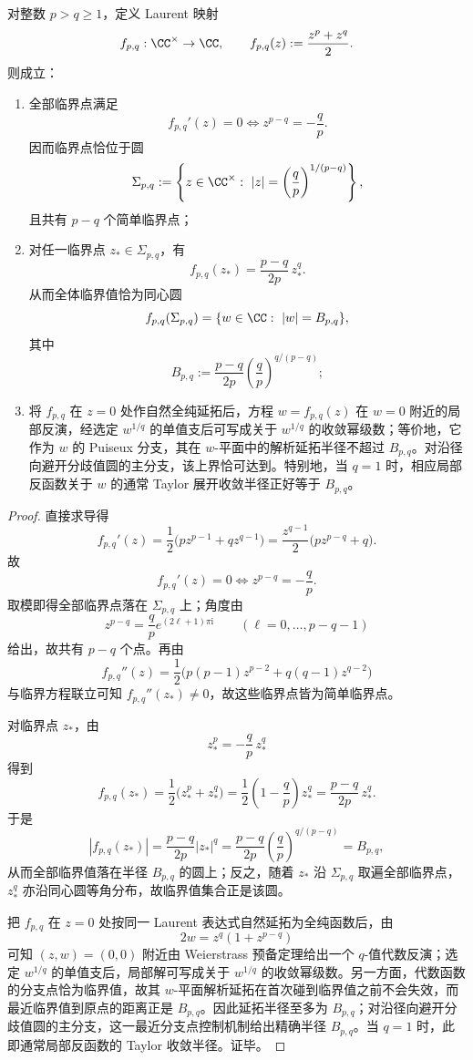 \begin{theorem}\label{thm:cdim-laurent-double-frequency-critical-value-circle}
对整数 \(p>q\ge 1\)，定义 Laurent 映射
\[
f_{p,q}:\CC^\times\to\CC,
\qquad
f_{p,q}(z):=\frac{z^p+z^q}{2}.
\]
则成立：
\begin{enumerate}
  \item 全部临界点满足
  \[
  f_{p,q}'(z)=0
  \iff
  z^{p-q}=-\frac{q}{p}.
  \]
  因而临界点恰位于圆
  \[
  \Sigma_{p,q}:=
  \left\{
  z\in\CC^\times:\ |z|=\left(\frac{q}{p}\right)^{1/(p-q)}
  \right\},
  \]
  且共有 \(p-q\) 个简单临界点；
  \item 对任一临界点 \(z_\ast\in\Sigma_{p,q}\)，有
  \[
  f_{p,q}(z_\ast)=\frac{p-q}{2p}\,z_\ast^q.
  \]
  从而全体临界值恰为同心圆
  \[
  f_{p,q}(\Sigma_{p,q})
  =
  \{w\in\CC:\ |w|=B_{p,q}\},
  \]
  其中
  \[
  B_{p,q}:=\frac{p-q}{2p}\left(\frac{q}{p}\right)^{q/(p-q)};
  \]
  \item 将 \(f_{p,q}\) 在 \(z=0\) 处作自然全纯延拓后，方程 \(w=f_{p,q}(z)\) 在 \(w=0\) 附近的局部反演，经选定 \(w^{1/q}\) 的单值支后可写成关于 \(w^{1/q}\) 的收敛幂级数；等价地，它作为 \(w\) 的 Puiseux 分支，其在 \(w\)-平面中的解析延拓半径不超过 \(B_{p,q}\)。对沿径向避开分歧值圆的主分支，该上界恰可达到。特别地，当 \(q=1\) 时，相应局部反函数关于 \(w\) 的通常 Taylor 展开收敛半径正好等于 \(B_{p,q}\)。
\end{enumerate}
\end{theorem}
\begin{proof}
直接求导得
\[
f_{p,q}'(z)
=
\frac{1}{2}\bigl(pz^{p-1}+qz^{q-1}\bigr)
=
\frac{z^{q-1}}{2}\bigl(pz^{p-q}+q\bigr).
\]
故
\[
f_{p,q}'(z)=0
\iff
z^{p-q}=-\frac{q}{p}.
\]
取模即得全部临界点落在 \(\Sigma_{p,q}\) 上；角度由
\[
z^{p-q}=\frac{q}{p}e^{(2\ell+1)\pi\mathrm{i}}
\qquad
(\ell=0,\dots,p-q-1)
\]
给出，故共有 \(p-q\) 个点。再由
\[
f_{p,q}''(z)
=
\frac{1}{2}\bigl(p(p-1)z^{p-2}+q(q-1)z^{q-2}\bigr)
\]
与临界方程联立可知 \(f_{p,q}''(z_\ast)\neq 0\)，故这些临界点皆为简单临界点。

对临界点 \(z_\ast\)，由
\[
z_\ast^p=-\frac{q}{p}\,z_\ast^q
\]
得到
\[
f_{p,q}(z_\ast)
=
\frac{1}{2}\bigl(z_\ast^p+z_\ast^q\bigr)
=
\frac{1}{2}\left(1-\frac{q}{p}\right)z_\ast^q
=
\frac{p-q}{2p}\,z_\ast^q.
\]
于是
\[
|f_{p,q}(z_\ast)|
=
\frac{p-q}{2p}|z_\ast|^q
=
\frac{p-q}{2p}\left(\frac{q}{p}\right)^{q/(p-q)}
=
B_{p,q},
\]
从而全部临界值落在半径 \(B_{p,q}\) 的圆上；反之，随着 \(z_\ast\) 沿 \(\Sigma_{p,q}\) 取遍全部临界点，\(z_\ast^q\) 亦沿同心圆等角分布，故临界值集合正是该圆。

把 \(f_{p,q}\) 在 \(z=0\) 处按同一 Laurent 表达式自然延拓为全纯函数后，由
\[
2w=z^q(1+z^{p-q})
\]
可知 \((z,w)=(0,0)\) 附近由 Weierstrass 预备定理给出一个 \(q\)-值代数反演；选定 \(w^{1/q}\) 的单值支后，局部解可写成关于 \(w^{1/q}\) 的收敛幂级数。另一方面，代数函数的分支点恰为临界值，故其 \(w\)-平面解析延拓在首次碰到临界值之前不会失效，而最近临界值到原点的距离正是 \(B_{p,q}\)。因此延拓半径至多为 \(B_{p,q}\)；对沿径向避开分歧值圆的主分支，这一最近分支点控制机制给出精确半径 \(B_{p,q}\)。当 \(q=1\) 时，此即通常局部反函数的 Taylor 收敛半径。证毕。
\end{proof}

